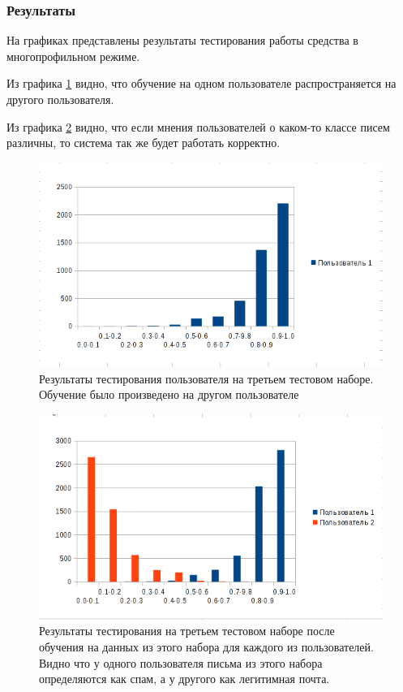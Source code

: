 \subsubsection{Результаты}
На графиках представлены результаты тестирования работы средства в многопрофильном режиме. 

Из графика \ref{EXPERIMENT2} видно, что обучение на одном пользователе распространяется на другого пользователя.

Из графика \ref{EXPERIMENT3} видно, что если мнения пользователей о каком-то классе писем различны, то система так же будет работать корректно.
\begin{figure}[h]
\begin{center}
\includegraphics[width=15cm]{img/experiment2}
\end{center}
\caption{Результаты тестирования пользователя на третьем тестовом наборе. Обучение было произведено на другом пользователе \cite{SAPC}}
\label{EXPERIMENT2}
\end{figure}

\begin{figure}[h]
\begin{center}
\includegraphics[width=15cm]{img/experiment3}
\end{center}
\caption{Результаты тестирования на третьем тестовом наборе после обучения на данных из этого набора для каждого из пользователей. Видно что у одного пользователя письма из этого набора определяются как спам, а у другого как легитимная почта.}
\label{EXPERIMENT3}
\end{figure}

